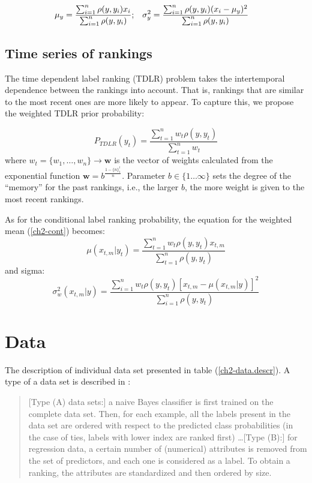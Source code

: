 \begin{align}
\label{ch2-mu}
\mu_y &=\frac{\sum_{i=1}^n  \rho(y,y_i) x_i}{\sum_{i=1}^n \rho(y,y_i)};&
\sigma_y^2&=\frac{\sum_{i=1}^n \rho(y,y_i) (x_i-\mu_y)^2}{\sum_{i=1}^n \rho(y,y_i)} \notag
\end{align}

\subsection{Time series of rankings}
\label{ch2-sec:time}
The time dependent label ranking (TDLR) problem  takes the intertemporal dependence between the rankings into account. That is, rankings that are similar to the most recent ones are more likely to appear. %
 To capture this, we propose the weighted TDLR prior probability:

\begin{equation}
P_{TDLR}(y_t) =\frac{\sum_{t=1}^{n}  w_t \rho(y,y_t)}{ \sum_{t=1}^{n} w_t  }
\label{ch2-eq:timing}
\end{equation}
where $w_t = \{w_1, \ldots, w_{n}\} \rightarrow \mathbf{w}$  is the vector of weights calculated from the exponential function $\mathbf{w}=b ^{\frac{1-\{n\}_{1}^t } {n}}$. Parameter $b \in  \{1 \ldots \infty\}$ sets the degree of the ``memory'' for the past rankings, i.e.,  the larger $b$, the more weight is given to the most recent rankings. %

As for the conditional label ranking probability, the equation for the weighted mean (\ref{ch2-cont}) becomes:
\begin{equation}
\label{ch2-mu.w}
\mu(x_{t,m}|y_t) = \frac{\sum_{t=1}^n  w_t \rho(y,y_t) x_{t,m}}{\sum_{t=1}^n \rho(y,y_t)}
\end{equation}
and sigma:
\begin{equation}
\label{ch2-sigma}
\sigma_{w}^2(x_{t,m}|y)=\frac{\sum_{i=1}^n w_{t} \rho(y,y_t) [x_{t,m}-\mu(x_{t,m}|y)]^2}{\sum_{i=1}^n \rho(y,y_t)}
\end{equation}


\section{Data}
\label{ch2-sec:data}

The description of individual data set presented in table (\ref{ch2-data.descr}). A type of a data set is described in \cite{cheng2009}:
\begin{quotation}
[Type (A) data sets:] a naive Bayes classifier is first trained on the complete data set. Then, for each example, all the labels present in the data set are ordered with respect to the predicted class probabilities (in the case of ties, labels with lower index are ranked first) \ldots [Type (B):] for regression data, a certain number of (numerical) attributes is removed from the set of predictors, and each one is considered as a label. To obtain a ranking, the attributes are standardized and then ordered by size.
\end{quotation}

